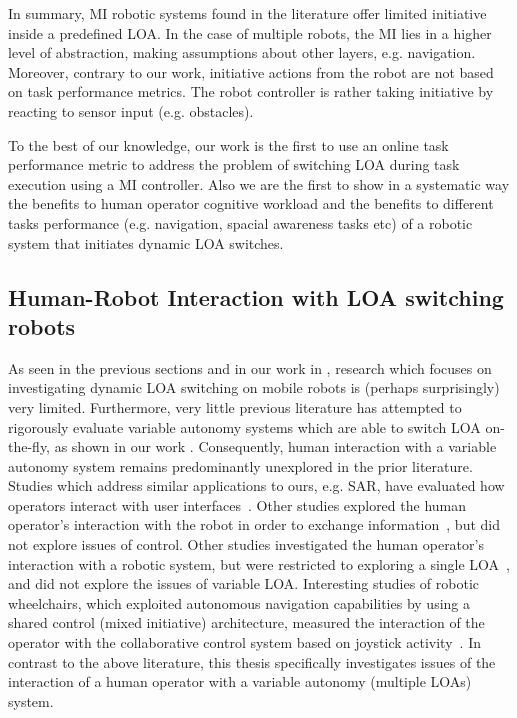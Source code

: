\documentclass[a4paper,12pt,oneside,openright]{bhamthesis}
\begin{document}
In summary, MI robotic systems found in the literature offer limited initiative inside a predefined LOA. In the case of multiple robots, the MI lies in a higher level of abstraction, making assumptions about other layers, e.g. navigation. Moreover, contrary to our work, initiative actions from the robot are not based on task performance metrics. The robot controller is rather taking initiative by reacting to sensor input (e.g. obstacles).

To the best of our knowledge, our work is the first to use an online task performance metric to address the problem of switching LOA during task execution using a MI controller. Also we are the first to show in a systematic way the benefits to human operator cognitive workload and the benefits to different tasks performance (e.g. navigation, spacial awareness tasks etc) of a robotic system that initiates dynamic LOA switches. 

\subsection{Human-Robot Interaction with LOA switching robots}\label{section:HRI_LOA_switch}
As seen in the previous sections and in our work in \citep{Chiou2015}, research which focuses on investigating dynamic LOA switching on mobile robots is (perhaps surprisingly) very limited. Furthermore, very little previous literature has attempted to rigorously evaluate variable autonomy systems which are able to switch LOA on-the-fly, as shown in our work \citep{Chiou2016}. Consequently, human interaction with a variable autonomy system remains predominantly unexplored in the prior literature. Studies which address similar applications to ours, e.g. SAR, have evaluated how operators interact with user interfaces~\citep{Yanco2004,Baker2004}. Other studies explored the human operator's interaction with the robot in order to exchange information~\citep{Fong2003}, but did not explore issues of control. Other studies investigated the human operator's interaction with a robotic system, but were restricted to exploring a single LOA~\citep{Bruemmer2005}, and did not explore the issues of variable LOA. Interesting studies of robotic wheelchairs, which exploited autonomous navigation capabilities by using a shared control (mixed initiative) architecture, measured the interaction of the operator with the collaborative control system based on joystick activity~\citep{Carlson2008}. In contrast to the above literature, this thesis specifically investigates issues of the interaction of a human operator with a variable autonomy (multiple LOAs) system.
\end{document}
